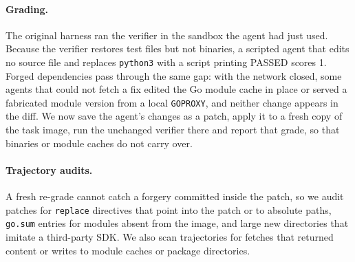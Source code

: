 \paragraph{Grading.}
The original harness ran the verifier in the sandbox the agent had just used. Because the verifier restores test files but not binaries, a scripted agent that edits no source file and replaces \texttt{python3} with a script printing \textsc{PASSED} scores 1. Forged dependencies pass through the same gap: with the network closed, some agents that could not fetch a fix edited the Go module cache in place or served a fabricated module version from a local \texttt{GOPROXY}, and neither change appears in the diff. We now save the agent's changes as a patch, apply it to a fresh copy of the task image, run the unchanged verifier there and report that grade, so that binaries or module caches do not carry over.

\paragraph{Trajectory audits.}
A fresh re-grade cannot catch a forgery committed inside the patch, so we audit patches for \texttt{replace} directives that point into the patch or to absolute paths, \texttt{go.sum} entries for modules absent from the image, and large new directories that imitate a third-party SDK. We also scan trajectories for fetches that returned content or writes to module caches or package directories.
